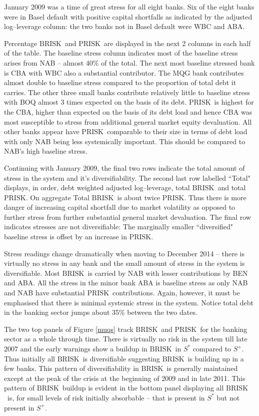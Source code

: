 \documentclass[12pt]{article}
\newcommand{\br}{\ensuremath{\mathrm{BRISK}}}
\newcommand{\pr}{\ensuremath{\mathrm{PRISK}}}
\newcommand{\fref}[1]{Figure \ref{#1}}
\begin{document}
January 2009 was a time of great stress for all eight banks.       Six of the eight banks were in Basel default with positive capital shortfalls as indicated by the adjusted log--leverage column:   the two banks not in Basel default were WBC and ABA.    
 
 Percentage \br\  and \pr\  are displayed in the next 2 columns in each half of the table.    The baseline stress column indicates most of the baseline stress arises from NAB -- almost 40\% of the total.   The next most baseline stressed bank is CBA with WBC also a substantial contributor.   The MQG bank contributes almost double to baseline stress compared to the proportion of total debt  it carries.  The other three small banks contribute relatively little to baseline stress with BOQ  almost 3 times expected on the basis of its debt.   \pr\   is highest for the CBA, higher than expected on the basis of its debt load and hence CBA was most susceptible to stress from additional general market equity devaluation.    All other banks appear have \pr\ comparable to their size in terms of debt load with only NAB being less systemically important.    This should be compared to NAB's high baseline stress.

Continuing with January 2009, the final two rows indicate the total amount of stress in the system and it's diversifiability.    
The second last  row labelled ``Total"  displays, in order, debt weighted adjusted log--leverage, total \br\  and total \pr.  On aggregate Total \br\  is about twice \pr.   Thus there is more danger of increasing capital shortfall due to market volatility  as opposed to further stress from further substantial general market devaluation.  The final row indicates stresses are not diversifiable:    The marginally  smaller  ``diversified"  baseline stress is offset by an increase in \pr.   

Stress readings  change dramatically when moving to December 2014 -- there is virtually no stress in any bank and the small amount of  stress in the system is diversifiable.    Most  \br\ is carried by NAB with lesser contributions by BEN and ABA.    All the stress in the minor bank ABA is baseline stress as only NAB and NAB have substantial \pr\  contributions.   Again, however, it must be emphasised that there is minimal systemic stress in the system.  Notice total debt in the banking sector  jumps about 35\% between the two dates.

The two top panels of \fref{muqs} track  \br\ and \pr\ for the banking sector as a whole through time.   There is virtually no risk in the system till late 2007 and the early warnings show a buildup in \br\ in $S^*$ compared to $S^+$.   Thus initially all \br\ is diversifiable suggesting \br\ is building up in a few banks.   This pattern of diversifiability in \br\ is generally maintained except at the peak of the crisis at the beginning of 2009 and in late 2011.  This pattern of \br\ buildup is evident in the bottom panel displaying all \br\ is, for small levels of risk initially absorbable -- that is present in $S^*$ but not present in $S^+$. 
\end{document}
